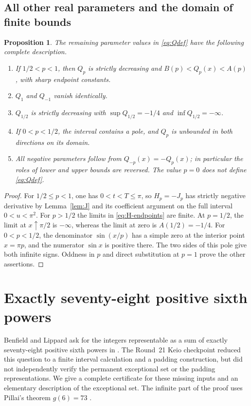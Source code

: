 \documentclass[11pt,a4paper]{article}
\numberwithin{equation}{section}
\newtheorem{proposition}[theorem]{Proposition}
\theoremstyle{remark}
\begin{document}
\subsection{All other real parameters and the domain of finite bounds}

\begin{proposition}\label{prop:other-p}
The remaining parameter values in \eqref{eq:Qdef} have the following
complete description.
\begin{enumerate}[label=(\roman*)]
\item If $1/2<p<1$, then $Q_p$ is strictly decreasing and
$B(p)<Q_p(x)<A(p)$, with sharp endpoint constants.
\item $Q_1$ and $Q_{-1}$ vanish identically.
\item $Q_{1/2}$ is strictly decreasing with
$\sup Q_{1/2}=-1/4$ and $\inf Q_{1/2}=-\infty$.
\item If $0<p<1/2$, the interval contains a pole, and $Q_p$ is
unbounded in both directions on its domain.
\item All negative parameters follow from $Q_{-p}(x)=-Q_p(x)$;
in particular the roles of lower and upper bounds are reversed.
The value $p=0$ does not define \eqref{eq:Qdef}.
\end{enumerate}
\end{proposition}

\begin{proof}
For $1/2\le p<1$, one has $0<t<T\le\pi$, so
$H_p=-J_p$ has strictly negative derivative by
Lemma~\ref{lem:J} and its coefficient argument on the full interval
$0<u<\pi^2$. For $p>1/2$ the limits in
\eqref{eq:H-endpoints} are finite. At $p=1/2$, the limit at
$x\uparrow\pi/2$ is $-\infty$, whereas the limit at zero is
$A(1/2)=-1/4$. For $0<p<1/2$, the denominator $\sin(x/p)$
has a simple zero at the interior point $x=\pi p$, and the
numerator $\sin x$ is positive there. The two sides of this pole
give both infinite signs. Oddness in $p$ and direct substitution
at $p=1$ prove the other assertions.
\end{proof}

\section{Exactly seventy-eight positive sixth powers}
\label{war:section}

Benfield and Lippard ask for the integers representable as a sum of exactly
seventy-eight positive sixth powers in \cite[Conjecture~6.4]{BenfieldLippard}.
The Round~21 Keio checkpoint reduced this question to a finite interval
calculation and a padding construction, but did not independently verify the
permanent exceptional set or the padding representations. We give a complete
certificate for these missing inputs and an elementary description of the
exceptional set. The infinite part of the proof uses Pillai's theorem
$g(6)=73$ \cite{Pillai1940}.
\end{document}
